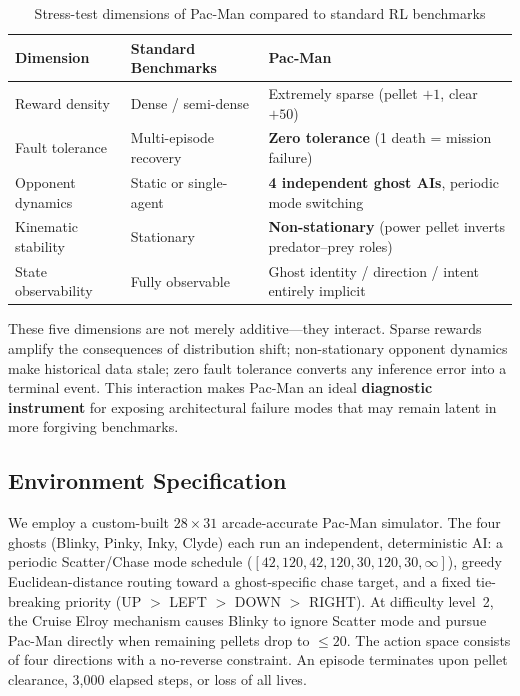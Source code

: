 \documentclass[11pt,a4paper]{article}
\theoremstyle{definition}
\begin{document}
\begin{table}[ht]
\centering
\small
\caption{Stress-test dimensions of Pac-Man compared to standard RL benchmarks}
\label{tab:env-comp}
\begin{tabular}{@{}p{3.2cm}p{3.8cm}p{5.2cm}@{}}
\toprule
\textbf{Dimension} & \textbf{Standard Benchmarks} & \textbf{Pac-Man} \\
\midrule
Reward density & Dense / semi-dense & Extremely sparse (pellet $+1$, clear $+50$) \\
Fault tolerance & Multi-episode recovery & \textbf{Zero tolerance} (1 death = mission failure) \\
Opponent dynamics & Static or single-agent & \textbf{4 independent ghost AIs}, periodic mode switching \\
Kinematic stability & Stationary & \textbf{Non-stationary} (power pellet inverts predator--prey roles) \\
State observability & Fully observable & Ghost identity / direction / intent entirely implicit \\
\bottomrule
\end{tabular}
\end{table}

These five dimensions are not merely additive---they interact.
Sparse rewards amplify the consequences of distribution shift; non-stationary opponent dynamics make historical data stale; zero fault tolerance converts any inference error into a terminal event.
This interaction makes Pac-Man an ideal \textbf{diagnostic instrument} for exposing architectural failure modes that may remain latent in more forgiving benchmarks.

\subsection{Environment Specification}

We employ a custom-built $28\times 31$ arcade-accurate Pac-Man simulator.
The four ghosts (Blinky, Pinky, Inky, Clyde) each run an independent, deterministic AI:
a periodic Scatter/Chase mode schedule ($[42, 120, 42, 120, 30, 120, 30, \infty]$),
greedy Euclidean-distance routing toward a ghost-specific chase target,
and a fixed tie-breaking priority (UP $>$ LEFT $>$ DOWN $>$ RIGHT).
At difficulty level~2, the Cruise Elroy mechanism causes Blinky to ignore Scatter mode and pursue Pac-Man directly when remaining pellets drop to $\leq 20$.
The action space consists of four directions with a no-reverse constraint.
An episode terminates upon pellet clearance, 3,000 elapsed steps, or loss of all lives.
\end{document}
